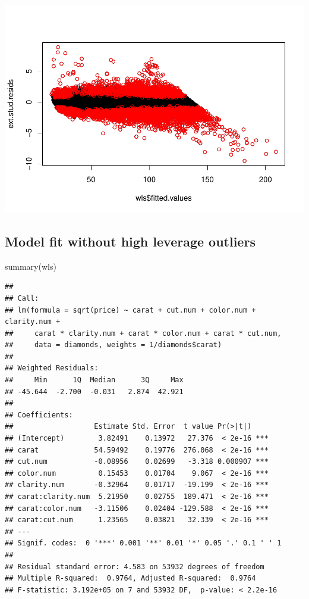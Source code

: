 \documentclass[
]{book}
\newenvironment{Shaded}{\begin{snugshade}}{\end{snugshade}}
\newcommand{\FunctionTok}[1]{\textcolor[rgb]{0.00,0.00,0.00}{#1}}
\newcommand{\NormalTok}[1]{#1}
\begin{document}
\includegraphics{13-MultipleLinearRegression_files/figure-latex/unnamed-chunk-23-4.pdf}

\hypertarget{model-fit-without-high-leverage-outliers}{%
\subsection{Model fit without high leverage outliers}\label{model-fit-without-high-leverage-outliers}}

\begin{Shaded}
\begin{Highlighting}[]
\FunctionTok{summary}\NormalTok{(wls)}
\end{Highlighting}
\end{Shaded}

\begin{verbatim}
## 
## Call:
## lm(formula = sqrt(price) ~ carat + cut.num + color.num + clarity.num + 
##     carat * clarity.num + carat * color.num + carat * cut.num, 
##     data = diamonds, weights = 1/diamonds$carat)
## 
## Weighted Residuals:
##     Min      1Q  Median      3Q     Max 
## -45.644  -2.700  -0.031   2.874  42.921 
## 
## Coefficients:
##                   Estimate Std. Error  t value Pr(>|t|)    
## (Intercept)        3.82491    0.13972   27.376  < 2e-16 ***
## carat             54.59492    0.19776  276.068  < 2e-16 ***
## cut.num           -0.08956    0.02699   -3.318 0.000907 ***
## color.num          0.15453    0.01704    9.067  < 2e-16 ***
## clarity.num       -0.32964    0.01717  -19.199  < 2e-16 ***
## carat:clarity.num  5.21950    0.02755  189.471  < 2e-16 ***
## carat:color.num   -3.11506    0.02404 -129.588  < 2e-16 ***
## carat:cut.num      1.23565    0.03821   32.339  < 2e-16 ***
## ---
## Signif. codes:  0 '***' 0.001 '**' 0.01 '*' 0.05 '.' 0.1 ' ' 1
## 
## Residual standard error: 4.583 on 53932 degrees of freedom
## Multiple R-squared:  0.9764, Adjusted R-squared:  0.9764 
## F-statistic: 3.192e+05 on 7 and 53932 DF,  p-value: < 2.2e-16
\end{verbatim}
\end{document}
